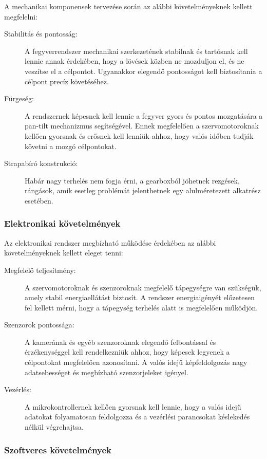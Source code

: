 \documentclass[12pt,a4paper]{article}
\begin{document}
A mechanikai komponensek tervezése során az alábbi követelményeknek kellett megfelelni:
\begin{description}
	\item[Stabilitás és pontosság:]  A fegyverrendszer mechanikai szerkezetének stabilnak és tartósnak kell lennie annak érdekében, hogy a lövések közben ne mozduljon el, és ne veszítse el a célpontot. Ugyanakkor elegendő pontosságot kell biztosítania a célpont precíz követéséhez.
	\item[Fürgeség:]A rendszernek képesnek kell lennie a fegyver gyors és pontos mozgatására a pan-tilt mechanizmus segítségével. Ennek megfelelően a szervomotoroknak kellően gyorsnak és erősnek kell lenniük ahhoz, hogy valós időben tudják követni a mozgó célpontokat.
	\item[Strapabíró konstrukció:] Habár nagy terhelés nem fogja érni, a gearboxból jöhetnek rezgések, rángások, amik esetleg problémát jelenthetnek egy alulméretezett alkatrész esetében.
\end{description}

\subsubsection*{Elektronikai követelmények}

Az elektronikai rendszer megbízható működése érdekében az alábbi követelményeknek kellett eleget tenni:

\begin{description}
	\item[Megfelelő teljesítmény:]  A szervomotoroknak és szenzoroknak megfelelő tápegységre van szükségük, amely stabil energiaellátást biztosít. A rendszer energiaigényét előzetesen fel kellett mérni, hogy a tápegység terhelés alatt is megfelelően működjön.
	\item[Szenzorok pontossága:] A kamerának és egyéb szenzoroknak elegendő felbontással és érzékenységgel kell rendelkezniük ahhoz, hogy képesek legyenek a célpontokat megfelelően azonosítani. A valós idejű képfeldolgozás nagy adatsebességet és megbízható szenzorjeleket igényel.
	\item[Vezérlés:] A mikrokontrollernek kellően gyorsnak kell lennie, hogy a valós idejű adatokat folyamatosan feldolgozza és a vezérlési parancsokat késlekedés nélkül végrehajtsa.
\end{description}


\subsubsection*{Szoftveres követelmények}
\end{document}
